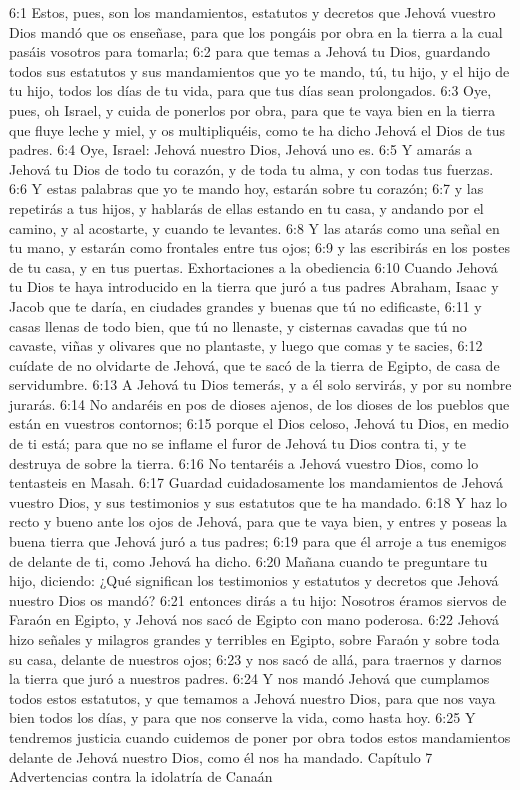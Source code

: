 6:1 Estos, pues, son los mandamientos, estatutos y decretos que Jehová vuestro Dios mandó que os enseñase, para que los pongáis por obra en la tierra a la cual pasáis vosotros para tomarla;  
6:2 para que temas a Jehová tu Dios, guardando todos sus estatutos y sus mandamientos que yo te mando, tú, tu hijo, y el hijo de tu hijo, todos los días de tu vida, para que tus días sean prolongados.  
6:3 Oye, pues, oh Israel, y cuida de ponerlos por obra, para que te vaya bien en la tierra que fluye leche y miel, y os multipliquéis, como te ha dicho Jehová el Dios de tus padres.  
6:4 Oye, Israel: Jehová nuestro Dios, Jehová uno es.  
6:5 Y amarás a Jehová tu Dios de todo tu corazón, y de toda tu alma, y con todas tus fuerzas.  
6:6 Y estas palabras que yo te mando hoy, estarán sobre tu corazón;  
6:7 y las repetirás a tus hijos, y hablarás de ellas estando en tu casa, y andando por el camino, y al acostarte, y cuando te levantes.  
6:8 Y las atarás como una señal en tu mano, y estarán como frontales entre tus ojos;  
6:9 y las escribirás en los postes de tu casa, y en tus puertas.  
Exhortaciones a la obediencia  
6:10 Cuando Jehová tu Dios te haya introducido en la tierra que juró a tus padres Abraham, Isaac y Jacob que te daría, en ciudades grandes y buenas que tú no edificaste,  
6:11 y casas llenas de todo bien, que tú no llenaste, y cisternas cavadas que tú no cavaste, viñas y olivares que no plantaste, y luego que comas y te sacies,  
6:12 cuídate de no olvidarte de Jehová, que te sacó de la tierra de Egipto, de casa de servidumbre.  
6:13 A Jehová tu Dios temerás, y a él solo servirás, y por su nombre jurarás.  
6:14 No andaréis en pos de dioses ajenos, de los dioses de los pueblos que están en vuestros contornos;  
6:15 porque el Dios celoso, Jehová tu Dios, en medio de ti está; para que no se inflame el furor de Jehová tu Dios contra ti, y te destruya de sobre la tierra.  
6:16 No tentaréis a Jehová vuestro Dios, como lo tentasteis en Masah.  
6:17 Guardad cuidadosamente los mandamientos de Jehová vuestro Dios, y sus testimonios y sus estatutos que te ha mandado.  
6:18 Y haz lo recto y bueno ante los ojos de Jehová, para que te vaya bien, y entres y poseas la buena tierra que Jehová juró a tus padres;  
6:19 para que él arroje a tus enemigos de delante de ti, como Jehová ha dicho.  
6:20 Mañana cuando te preguntare tu hijo, diciendo: ¿Qué significan los testimonios y estatutos y decretos que Jehová nuestro Dios os mandó?  
6:21 entonces dirás a tu hijo: Nosotros éramos siervos de Faraón en Egipto, y Jehová nos sacó de Egipto con mano poderosa.  
6:22 Jehová hizo señales y milagros grandes y terribles en Egipto, sobre Faraón y sobre toda su casa, delante de nuestros ojos;  
6:23 y nos sacó de allá, para traernos y darnos la tierra que juró a nuestros padres.  
6:24 Y nos mandó Jehová que cumplamos todos estos estatutos, y que temamos a Jehová nuestro Dios, para que nos vaya bien todos los días, y para que nos conserve la vida, como hasta hoy.  
6:25 Y tendremos justicia cuando cuidemos de poner por obra todos estos mandamientos delante de Jehová nuestro Dios, como él nos ha mandado.  
Capítulo 7 
Advertencias contra la idolatría de Canaán   

